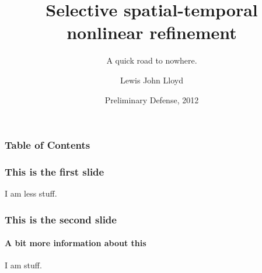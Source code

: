 \documentclass{beamer}
\title[Department of Nuclear Engineering and Engineering Physics]{Selective spatial-temporal nonlinear refinement}
\subtitle{A quick road to nowhere.}
\author[Lloyd]{Lewis John Lloyd\inst{1}}
\institute[University of Wisconsin - Madison]
{
  \inst{1}%
  University of Wisconsin - Madison
}
\date[KPT 2004]{Preliminary Defense, 2012}
\begin{document}
\frame{\titlepage}

\begin{frame}
\frametitle{Table of Contents}
\tableofcontents[currentsection]

\end{frame}

\begin{frame}
\frametitle{This is the first slide}

I am less stuff.

\end{frame}

\begin{frame}
\frametitle{This is the second slide}
\framesubtitle{A bit more information about this}

I am stuff.

\end{frame}
\end{document}
